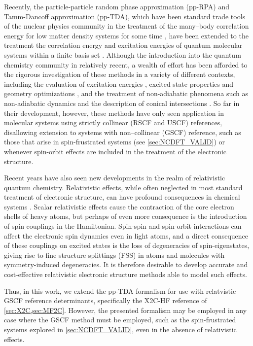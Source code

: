 Recently, the particle-particle random phase approximation (pp-RPA) and 
Tamm-Dancoff approximation (pp-TDA), which have been standard trade tools of 
the nuclear physics community in the treatment of the many--body correlation energy for low matter density 
systems for some time \cite{SchuckBook_04}, 
have been extended to the treatment the correlation energy and excitation energies of quantum 
molecular systems within a finite basis set \cite{Yang13_224105,Yang13_18A522,
Yang13_174110,Yang13_104112,Yang13_030501,Yang09_066403,Bulik13_104113}.  Although the
introduction into the quantum chemistry community in relatively recent, a wealth 
of effort has been afforded to the rigorous investigation of these methods in a 
variety of different contexts, including the evaluation of excitation 
energies \cite{Yang13_224105,Yang13_18A522,Yang13_174110}, excited state properties 
and geometry optimizations \cite{Yang15_1025}, and the treatment of non-adiabatic 
phenomena such as non-adiabatic dynamics \cite{Liu14_244105} and the description 
of conical intersections \cite{Yang16_2407}.  So far in their development, however, 
these methods have only seen application in molecular systems using strictly 
collinear (RSCF and USCF) references, disallowing extension to systems with 
non--collinear (GSCF) reference, such as those that arise in spin-frustrated systems 
(see \cref{sec:NCDFT_VALID}) or whenever spin-orbit effects are included in the 
treatment of the electronic structure.


Recent years have also seen new developments in the realm of relativistic quantum 
chemistry.  Relativistic effects, while often neglected in most standard treatment
of electronic structure, can have profound consequences in chemical 
systems \cite{Pyykko12_45}.  Scalar relativistic effects cause the contraction of 
the core electron shells of heavy atoms, but perhaps of even more consequence is 
the introduction of spin couplings in the Hamiltonian.  Spin-spin and spin-orbit 
interactions can affect the electronic spin dynamics even in light atoms, and a 
direct consequence of these couplings on excited states is the loss of degeneracies
of spin-eigenstates, giving rise to fine structure splittings (FSS) in atoms and 
molecules with symmetry-induced degeneracies. It is therefore desirable to develop accurate and 
cost-effective relativistic electronic structure methods able to model such effects. 


Thus, in this work, we extend the pp-TDA formalism for use with 
relatvistic GSCF reference determinants, specifically the X2C-HF reference of \cref{sec:X2C,sec:MF2C}. 
However, the presented formalism may be employed in any case where the GSCF method must be
employed, such as the spin-frustrated systems explored in \cref{sec:NCDFT_VALID},
even in the absence of relativistic effects. 




